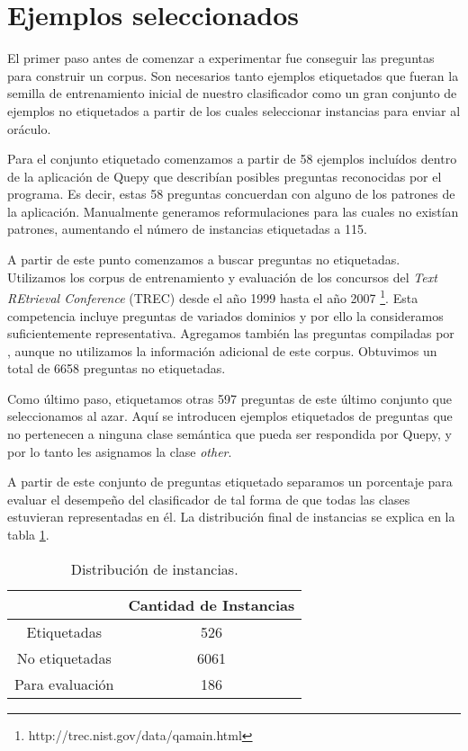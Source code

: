 \section{Ejemplos seleccionados}\label{descripcion-corpus}

El primer paso antes de comenzar a experimentar fue conseguir las preguntas para construir un corpus. Son necesarios tanto ejemplos etiquetados que fueran la semilla de entrenamiento inicial de nuestro clasificador como un gran conjunto de ejemplos no etiquetados a partir de los cuales seleccionar instancias para enviar al oráculo.

Para el conjunto etiquetado comenzamos a partir de 58 ejemplos incluídos dentro de la aplicación de Quepy que describían posibles preguntas reconocidas por el programa. Es decir, estas 58 preguntas concuerdan con alguno de los patrones de la aplicación. Manualmente generamos reformulaciones para las cuales no existían patrones, aumentando el número de instancias etiquetadas a 115.

A partir de este punto comenzamos a buscar preguntas no etiquetadas. Utilizamos los corpus de entrenamiento y evaluación de los concursos del \textit{Text REtrieval Conference} (TREC) desde el año 1999 hasta el año 2007 \footnote{http://trec.nist.gov/data/qamain.html}. Esta competencia incluye preguntas de variados dominios y por ello la consideramos suficientemente representativa. Agregamos también las preguntas compiladas por \citet{corpus-stanford}, aunque no utilizamos la información adicional de este corpus. Obtuvimos un total de 6658 preguntas no etiquetadas.

Como último paso, etiquetamos otras 597 preguntas de este último conjunto que seleccionamos al azar. Aquí se introducen ejemplos etiquetados de preguntas que no pertenecen a ninguna clase semántica que pueda ser respondida por Quepy, y por lo tanto les asignamos la clase \textit{other}.

A partir de este conjunto de preguntas etiquetado separamos un porcentaje para evaluar el desempeño del clasificador de tal forma de que todas las clases estuvieran representadas en él. La distribución final de instancias se explica en la tabla \ref{dist-corpus}.

\begin{table}[h!]\label{dist-corpus}
\centering
\begin{tabular}{c c}
     & Cantidad de Instancias\\ [0.5ex]
    \hline
    Etiquetadas & 526 \\ [0.5ex]
    No etiquetadas & 6061 \\ [0.5ex]
    Para evaluación & 186 \\[1ex]
    \hline
\end{tabular}
\caption{Distribución de instancias.}
\end{table}

